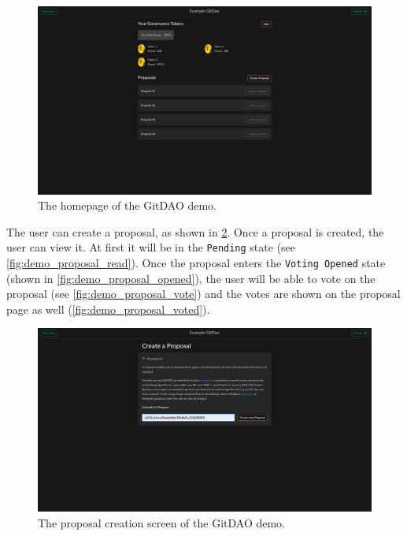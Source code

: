 \begin{figure}[ht!]
  \includegraphics[width=\linewidth]{images/demo/homepage.png}
  \caption{\label{fig:demo_homepage}The homepage of the GitDAO demo.}
\end{figure}

The user can create a proposal, as shown in \cref{fig:demo_proposal_create}.
Once a proposal is created, the user can view it.
At first it will be in the \texttt{Pending} state (see \cref{fig:demo_proposal_read}).
Once the proposal enters the \texttt{Voting Opened} state (shown in \cref{fig:demo_proposal_opened}), the user will be able to vote on the proposal (see \cref{fig:demo_proposal_vote}) and the votes are shown on the proposal page as well (\cref{fig:demo_proposal_voted}).

\begin{figure}[ht!]
  \includegraphics[width=\linewidth]{images/demo/proposal_create.png}
  \caption{\label{fig:demo_proposal_create}The proposal creation screen of the GitDAO demo.}
\end{figure}

